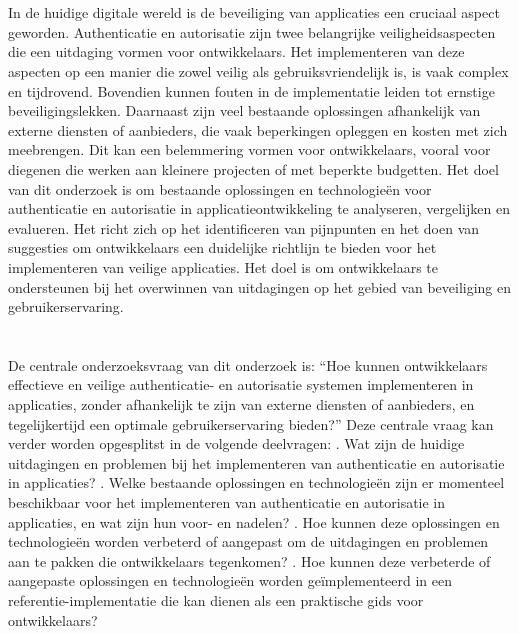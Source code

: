 \section{}%
\label{sec:probleemstelling}
In de huidige digitale wereld is de beveiliging van applicaties een cruciaal aspect geworden. Authenticatie en autorisatie zijn twee belangrijke veiligheidsaspecten die een uitdaging vormen voor ontwikkelaars. 
Het implementeren van deze aspecten op een manier die zowel veilig als gebruiksvriendelijk is, is vaak complex en tijdrovend. Bovendien kunnen fouten in de implementatie leiden tot ernstige beveiligingslekken. 
\newline
Daarnaast zijn veel bestaande oplossingen afhankelijk van externe diensten of aanbieders, die vaak beperkingen opleggen en kosten met zich meebrengen. Dit kan een belemmering vormen voor ontwikkelaars, 
vooral voor diegenen die werken aan kleinere projecten of met beperkte budgetten.
\newline
Het doel van dit onderzoek is om bestaande oplossingen en technologieën voor authenticatie en autorisatie in applicatieontwikkeling te analyseren, vergelijken en evalueren. 
Het richt zich op het identificeren van pijnpunten en het doen van suggesties om ontwikkelaars een duidelijke richtlijn te bieden voor het implementeren van veilige applicaties. 
Het doel is om ontwikkelaars te ondersteunen bij het overwinnen van uitdagingen op het gebied van beveiliging en gebruikerservaring.

\section{}%
\label{sec:onderzoeksvraag}

De centrale onderzoeksvraag van dit onderzoek is: ``Hoe kunnen ontwikkelaars effectieve en veilige authenticatie- en autorisatie systemen implementeren in applicaties, zonder afhankelijk te zijn van 
externe diensten of aanbieders, en tegelijkertijd een optimale gebruikerservaring bieden?''
\newline
\newline
Deze centrale vraag kan verder worden opgesplitst in de volgende deelvragen:
\newline
{}. Wat zijn de huidige uitdagingen en problemen bij het implementeren van authenticatie en autorisatie in applicaties?
. Welke bestaande oplossingen en technologieën zijn er momenteel beschikbaar voor het implementeren van authenticatie en autorisatie in applicaties, en wat zijn hun voor- en nadelen?
. Hoe kunnen deze oplossingen en technologieën worden verbeterd of aangepast om de uitdagingen en problemen aan te pakken die ontwikkelaars tegenkomen?
. Hoe kunnen deze verbeterde of aangepaste oplossingen en technologieën worden geïmplementeerd in een referentie-implementatie die kan dienen als een praktische gids voor ontwikkelaars?

